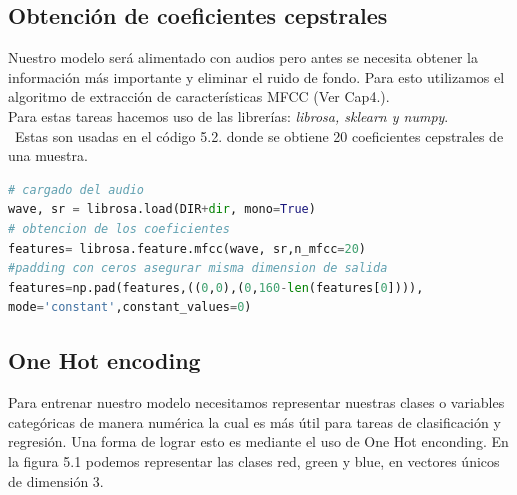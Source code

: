 \subsection{Obtención de coeficientes cepstrales}
Nuestro modelo será alimentado con audios pero antes se necesita obtener la información más importante y eliminar el ruido de fondo. Para esto utilizamos el algoritmo de extracción de características MFCC  (Ver Cap4.).\\  Para estas tareas hacemos uso de las librerías: \textit{librosa, sklearn y numpy}.\\\ Estas son usadas en el código 5.2. donde se obtiene 20 coeficientes cepstrales de una muestra.
\begin{lstlisting}[language=Python,caption=Obtención de MFCC,captionpos=b]
# cargado del audio
wave, sr = librosa.load(DIR+dir, mono=True)
# obtencion de los coeficientes
features= librosa.feature.mfcc(wave, sr,n_mfcc=20)
#padding con ceros asegurar misma dimension de salida
features=np.pad(features,((0,0),(0,160-len(features[0]))),
mode='constant',constant_values=0)

\end{lstlisting}

\subsection{One Hot encoding }
Para entrenar nuestro modelo necesitamos representar nuestras clases o variables categóricas de manera numérica la cual es más útil para tareas de clasificación y regresión. Una forma de lograr esto es mediante el uso de One Hot enconding. En la figura 5.1 podemos representar las clases red, green y blue, en vectores únicos de dimensión 3.

